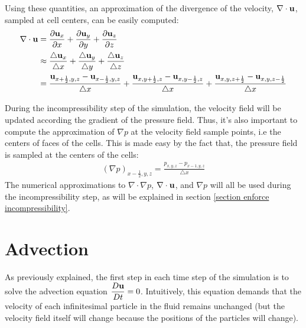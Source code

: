 Using these quantities, an approximation of the divergence of the velocity, $\nabla \cdot \textbf{u}$, sampled at cell centers, can be easily computed:
\begin{equation}
    \begin{aligned}
        \nabla \cdot \textbf{u} 
        &=
        \frac{\partial \textbf{u}_x}{\partial x} +  
        \frac{\partial \textbf{u}_y}{\partial y} +
        \frac{\partial \textbf{u}_z}{\partial z} \\
        &\approx 
        \frac{\triangle \textbf{u}_x}{\triangle x} +  
        \frac{\triangle \textbf{u}_y}{\triangle y} +
        \frac{\triangle \textbf{u}_z}{\triangle z}\\
        &= 
        \frac{\textbf{u}_{x+\frac{1}{2},y,z} - \textbf{u}_{x-\frac{1}{2},y,z}}{\triangle x} +  
        \frac{\textbf{u}_{x,y+\frac{1}{2},z} - \textbf{u}_{x,y-\frac{1}{2},z}}{\triangle x} +
        \frac{\textbf{u}_{x,y,z+\frac{1}{2}} - \textbf{u}_{x,y,z-\frac{1}{2}}}{\triangle x}
    \end{aligned}
    \label{eqn discrete div u}
\end{equation}

During the incompressibility step of the simulation, the velocity field will be updated according the gradient of the pressure field. Thus, it's also important to compute the approximation of $\nabla p$ at the velocity field sample points, i.e the centers of faces of the cells. This is made easy by the fact that, the pressure field is sampled at the centers of the cells:
\begin{equation}
    \label{eqn discrete grad p}
    \begin{aligned}
        (\nabla p)_{x-\frac{1}{2},y,z} = \frac{p_{x,y,z}-p_{x-1,y,z}}{\triangle x}
    \end{aligned}
\end{equation}
The numerical approximations to $\nabla \cdot \nabla p$, $\nabla \cdot \textbf{u}$, and $\nabla p$ will all be used during the incompressibility step, as will be explained in section \ref{section enforce incompressibility}.

\section{Advection}

As previously explained, the first step in each time step of the simulation is to solve the advection equation $\dfrac{D\textbf{u}}{Dt} = 0$. Intuitively, this equation demands that the velocity of each infinitesimal particle in the fluid remains unchanged (but the velocity field itself will change because the positions of the particles will change).

